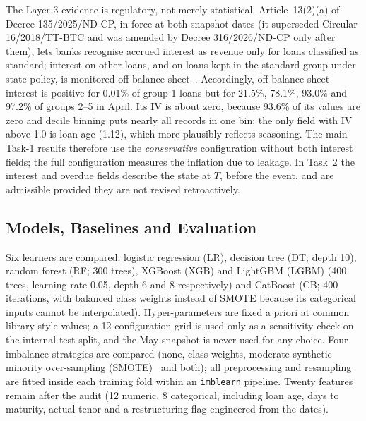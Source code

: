 \documentclass[runningheads]{llncs}
\begin{document}
The Layer-3 evidence is regulatory, not merely statistical. Article~13(2)(a) of Decree 135/2025/ND-CP, in force at both snapshot dates (it superseded Circular 16/2018/TT-BTC and was amended by Decree 316/2026/ND-CP only after them), lets banks recognise accrued interest as revenue only for loans classified as standard; interest on other loans, and on loans kept in the standard group under state policy, is monitored off balance sheet~\cite{gov2025nd135}. Accordingly, off-balance-sheet interest is positive for 0.01\% of group-1 loans but for 21.5\%, 78.1\%, 93.0\% and 97.2\% of groups 2--5 in April. Its IV is about zero, because 93.6\% of its values are zero and decile binning puts nearly all records in one bin; the only field with IV above 1.0 is loan age (1.12), which more plausibly reflects seasoning. The main Task-1 results therefore use the \emph{conservative} configuration without both interest fields; the full configuration measures the inflation due to leakage. In Task~2 the interest and overdue fields describe the state at $T$, before the event, and are admissible provided they are not revised retroactively.

\subsection{Models, Baselines and Evaluation}
\label{sec:eval}

Six learners are compared: logistic regression (LR), decision tree (DT; depth 10), random forest (RF; 300 trees), XGBoost (XGB) and LightGBM (LGBM) (400 trees, learning rate 0.05, depth 6 and 8 respectively) and CatBoost (CB; 400 iterations, with balanced class weights instead of SMOTE because its categorical inputs cannot be interpolated). Hyper-parameters are fixed a priori at common library-style values; a 12-configuration grid is used only as a sensitivity check on the internal test split, and the May snapshot is never used for any choice. Four imbalance strategies are compared (none, class weights, moderate synthetic minority over-sampling (SMOTE)~\cite{chawla2002smote} and both); all preprocessing and resampling are fitted inside each training fold within an \texttt{imblearn} pipeline. Twenty features remain after the audit (12 numeric, 8 categorical, including loan age, days to maturity, actual tenor and a restructuring flag engineered from the dates).
\end{document}
